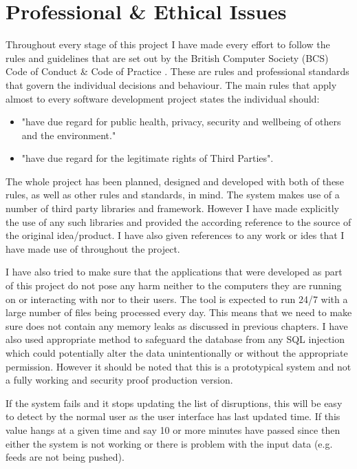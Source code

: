 \chapter{Professional \& Ethical Issues}
Throughout every stage of this project I have made every effort to follow the rules and guidelines that are set out by the British Computer Society (BCS) Code of Conduct \& Code of Practice \cite{bcsCodeOfConduct}. These are rules and professional standards that govern the individual decisions and behaviour. The main rules that apply almost to every software development project states the individual should:
\begin{itemize}
	\item "have due regard for public health, privacy, security and wellbeing of others and
the environment."\cite{bcsCodeOfConduct}
	\item "have due regard for the legitimate rights of Third Parties"\cite{bcsCodeOfConduct}.
\end{itemize}

The whole project has been planned, designed and developed with both of these rules, as well as other rules and standards, in mind. The system makes use of a number of third party libraries and framework. However I have made explicitly the use of any such libraries and provided the according reference to the source of the original idea/product. I have also given references to any work or ides that I have made use of throughout the project.

I have also tried to make sure that the applications that were developed as part of this project do not pose any harm neither to the computers they are running on or interacting with nor to their users. The tool is expected to run 24/7 with a large number of files being processed every day. This means that we need to make sure does not contain any memory leaks as discussed in previous chapters. I have also used appropriate method to safeguard the database from any SQL injection \cite{Su2006} which could potentially alter the data unintentionally or without the appropriate permission. However it should be noted that this is a prototypical system and not a fully working and security proof production version.

If the system fails and it stops updating the list of disruptions, this will be easy to detect by the normal user as the user interface has last updated time. If this value hangs at a given time and say 10 or more minutes have passed since then either the system is not working or there is problem with the input data (e.g. feeds are not being pushed).

